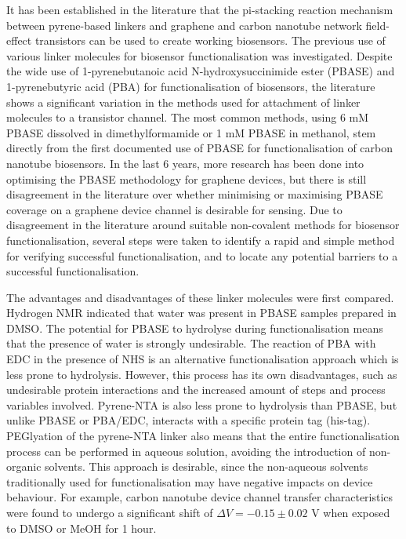 \documentclass[
  a4paper,
]{scrbook}
\begin{document}
It has been established in the literature that the pi-stacking reaction
mechanism between pyrene-based linkers and graphene and carbon nanotube
network field-effect transistors can be used to create working
biosensors. The previous use of various linker molecules for biosensor
functionalisation was investigated. Despite the wide use of
1-pyrenebutanoic acid N-hydroxysuccinimide ester (PBASE) and
1-pyrenebutyric acid (PBA) for functionalisation of biosensors, the
literature shows a significant variation in the methods used for
attachment of linker molecules to a transistor channel. The most common
methods, using 6 mM PBASE dissolved in dimethylformamide or 1 mM PBASE
in methanol, stem directly from the first documented use of PBASE for
functionalisation of carbon nanotube biosensors. In the last 6 years,
more research has been done into optimising the PBASE methodology for
graphene devices, but there is still disagreement in the literature over
whether minimising or maximising PBASE coverage on a graphene device
channel is desirable for sensing. Due to disagreement in the literature
around suitable non-covalent methods for biosensor functionalisation,
several steps were taken to identify a rapid and simple method for
verifying successful functionalisation, and to locate any potential
barriers to a successful functionalisation.

The advantages and disadvantages of these linker molecules were first
compared. Hydrogen NMR indicated that water was present in PBASE samples
prepared in DMSO. The potential for PBASE to hydrolyse during
functionalisation means that the presence of water is strongly
undesirable. The reaction of PBA with EDC in the presence of NHS is an
alternative functionalisation approach which is less prone to
hydrolysis. However, this process has its own disadvantages, such as
undesirable protein interactions and the increased amount of steps and
process variables involved. Pyrene-NTA is also less prone to hydrolysis
than PBASE, but unlike PBASE or PBA/EDC, interacts with a specific
protein tag (his-tag). PEGlyation of the pyrene-NTA linker also means
that the entire functionalisation process can be performed in aqueous
solution, avoiding the introduction of non-organic solvents. This
approach is desirable, since the non-aqueous solvents traditionally used
for functionalisation may have negative impacts on device behaviour. For
example, carbon nanotube device channel transfer characteristics were
found to undergo a significant shift of \(\Delta V = -0.15 \pm 0.02\) V
when exposed to DMSO or MeOH for 1 hour.
\end{document}
